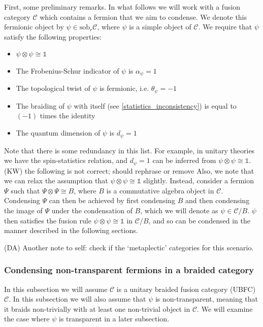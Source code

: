 \documentclass[12pt,a4paper]{article}
\newcommand{\tp}{\otimes}
\newcommand{\unit}{\mathds{1}}
\newcommand{\mcc}{\mathcal{C}}
\newcommand{\sob}{\text{sob}_r}
\newcommand{\ot}{\otimes}
\newcommand{\kw}[1]{{\color{kwcolor}\footnotesize{(KW) #1}}}
\newcommand{\dave}[1]{{\color{ao(english)}\footnotesize{(DA) #1}}}
\begin{document}
First, some preliminary remarks. 
In what follows we will work with a fusion category $\mathcal{C}$ which contains a fermion that we aim to condense. 
We denote this fermionic object by $\psi \in \sob\mcc$, 
where $\psi$ is a simple object of $\mcc$.
We require that $\psi$ satisfy the following properties:
\begin{itemize} 
	\item $\psi\ot\psi\cong\unit$
	\item The Frobenius-Schur indicator of $\psi$ is $\alpha_\psi =1$
	\item The topological twist of $\psi$ is fermionic, i.e. $\theta_\psi =-1$
	\item The braiding of $\psi$ with itself (see \eqref{statistics_inconsistency}) is equal to $(-1)$ times the identity
	\item The quantum dimension of $\psi$ is $d_\psi=1$
\end{itemize}
Note that there is some redundancy in this list.
For example, 
in unitary theories we have the spin-statistics relation, and $d_\psi=1$ can be inferred from $\psi\tp\psi \cong \unit$.
\kw{the following is not correct; should rephrase or remove}
Also, we note that we can relax the assumption that $\psi \tp \psi \cong \unit$ slightly. 
Instead, consider a fermion $\Psi$ such that $\Psi \tp \Psi \cong B$, 
where $B$ is a commutative algebra object in $\mcc$. Condensing $\Psi$ can then be achieved by first 
condensing $B$ and then condensing the image of $\Psi$ under the condensation of $B$, which 
we will denote as $\psi\in\mcc/B$. $\psi$ then satisfies the fusion rule $\psi\tp\psi\cong\unit$ in $\mcc /B$, and so 
can be condensed in the manner described in the following sections. 


\dave{Another note to self: check if the `metaplectic' categories for this scenario.}


\subsubsection{Condensing non-transparent fermions in a braided category}  \label{gntf_condense}


In this subsection we will assume $\mcc$ is a unitary braided fusion category (UBFC) $\mathcal{C}$.
In this subsection we will also assume that $\psi$ is non-transparent, meaning that it braids non-trivially with at least one non-trivial object in $\mcc$. 
We will examine the case where $\psi$ is transparent in a later subsection. 
\end{document}
